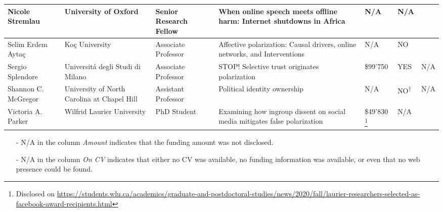 \begin{landscape}
\begin{longtable}[c]{|L{2.5cm}|L{3cm}|L{2cm}|L{5cm}|C{1.7cm}|C{1.3cm}|C{2.5cm}|}
Nicole Stremlau & University of Oxford & Senior Research Fellow & When online speech meets offline harm: Internet shutdowns in Africa & N/A & N/A & \tabularnewline\hline
Selim Erdem Aytaç & Koç University & Associate Professor & Affective polarization: Causal drivers, online networks, and Interventions & N/A & NO &  \tabularnewline\hline
Sergio Splendore & Universitá degli Studi di Milano & Associate Professor & STOP! Selective trust originates polarization & \$99'750 & YES & N/A \tabularnewline\hline
Shannon C. McGregor & University of North Carolina at Chapel Hill & Assistant Professor & Political identity ownership & N/A & NO\textsuperscript{$\dagger$} & N/A \tabularnewline\hline
Victoria A. Parker & Wilfrid Laurier University & PhD Student & Examining how ingroup dissent on social media mitigates false polarization & \$49'830 \footnote{Disclosed on \url{https://students.wlu.ca/academics/graduate-and-postdoctoral-studies/news/2020/fall/laurier-researchers-selected-as-facebook-award-recipients.html}} & N/A &  \tabularnewline\hline
\end{longtable}
\begin{itemize}
    \item[-] N/A in the column \textit{Amount} indicates that the funding amount was not disclosed.
    \item[-] N/A in the column \emph{On CV} indicates that either no CV was available, no funding information was available, or even that no web presence could be found. 
\end{itemize}
\end{landscape}